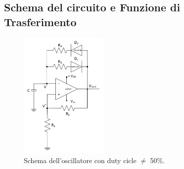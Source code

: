 \documentclass{report}
\begin{document}
\subsection{Schema del circuito e Funzione di Trasferimento}
\begin{figure}[h]
	\centering
	\includegraphics[height=6.2cm]{immagini/schema4}
	\caption{Schema dell'oscillatore con duty cicle $\neq$ 50\%.}
	\label{figura:schema4}
\end{figure}
\end{document}
